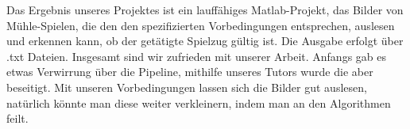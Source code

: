 \documentclass[paper=A4, deutsch]{scrartcl}
\begin{document}
Das Ergebnis unseres Projektes ist ein lauffähiges Matlab-Projekt, das Bilder von Mühle-Spielen, die den den spezifizierten Vorbedingungen entsprechen, auslesen und erkennen kann, ob der getätigte Spielzug gültig ist. Die Ausgabe erfolgt über .txt Dateien. 
Insgesamt sind wir zufrieden mit unserer Arbeit. Anfangs gab es etwas Verwirrung über die Pipeline, mithilfe unseres Tutors wurde die aber beseitigt.
Mit unseren Vorbedingungen lassen sich die Bilder gut auslesen, natürlich könnte man diese weiter verkleinern, indem man an den Algorithmen feilt.





\end{document}
